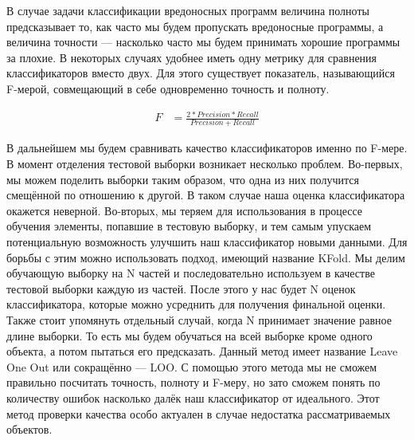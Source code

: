 В случае задачи классификации вредоносных программ величина полноты предсказывает то, как часто мы будем пропускать вредоносные программы, а величина точности — насколько часто мы будем принимать хорошие программы за плохие.
В некоторых случаях удобнее иметь одну метрику для сравнения классификаторов вместо двух.
Для этого существует показатель, называющийся F-мерой, совмещающий в себе одновременно точность и полноту.

\begin{figure}[ht]
\begin{align}
F &= \frac{2 * Precision * Recall}{Precision + Recall}
\end{align}
\end{figure}

В дальнейшем мы будем сравнивать качество классификаторов именно по F-мере.
В момент отделения тестовой выборки возникает несколько проблем. Во-первых, мы можем поделить выборки таким образом, что одна из них получится смещённой по отношению к другой. В таком случае наша оценка классификатора окажется неверной. Во-вторых, мы теряем для использования в процессе обучения элементы, попавшие в тестовую выборку, и тем самым упускаем потенциальную возможность улучшить наш классификатор новыми данными. Для борьбы с этим можно использовать подход, имеющий название KFold. Мы делим обучающую выборку на N частей и последовательно используем в качестве тестовой выборки каждую из частей. После этого у нас будет N оценок классификатора, которые можно усреднить для получения финальной оценки. 
Также стоит упомянуть отдельный случай, когда N принимает значение равное длине выборки. То есть мы будем обучаться на всей выборке кроме одного объекта, а потом пытаться его предсказать. Данный метод имеет название Leave One Out или сокращённо — LOO. С помощью этого метода мы не сможем правильно посчитать точность, полноту и F-меру, но зато сможем понять по количеству ошибок насколько далёк наш классификатор от идеального. Этот метод проверки качества особо актуален в случае недостатка рассматриваемых объектов. 

